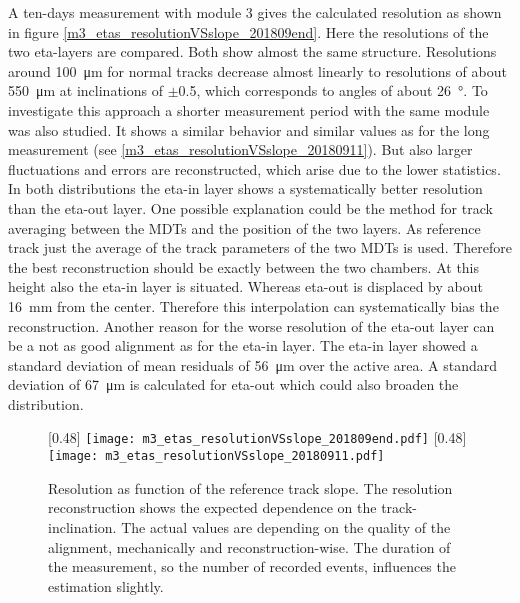 \documentclass[
twoside,            %
BCOR1.4cm,          %
10pt,               %
headings=normal,    %
headsepline,        %
clearplainpage,		%
final,              %
div=14,
open=right,
bibliography=toc
]{scrreprt}
\begin{document}
A ten-days measurement with module 3 gives the calculated resolution as shown in figure \ref{m3_etas_resolutionVSslope_201809end}.
Here the resolutions of the two eta-layers are compared.
Both show almost the same structure. 
Resolutions around \SI{100}{\micro m} for normal tracks decrease almost linearly to resolutions of about \SI{550}{\micro m} at inclinations of $\pm$0.5, which corresponds to angles of about \SI{26}{\degree}.
To investigate this approach a shorter measurement period with the same module was also studied.
It shows a similar behavior and similar values as for the long measurement (see \ref{m3_etas_resolutionVSslope_20180911}).
But also larger fluctuations and errors are reconstructed, which arise due to the lower statistics.
In both distributions the eta-in layer shows a systematically better resolution than the eta-out layer.
One possible explanation could be the method for track averaging between the MDTs and the position of the two layers.
As reference track just the average of the track parameters of the two MDTs is used.
Therefore the best reconstruction should be exactly between the two chambers.
At this height also the eta-in layer is situated.
Whereas eta-out is displaced by about \SI{16}{mm} from the center.
Therefore this interpolation can systematically bias the reconstruction.
Another reason for the worse resolution of the eta-out layer can be a not as good alignment as for the eta-in layer.
The eta-in layer showed a standard deviation of mean residuals of \SI{56}{\micro m} over the active area.
A standard deviation of \SI{67}{\micro m} is calculated for eta-out which could also broaden the distribution.

\begin{figure}[!h]
	\centering
	[0.48\textwidth]
	{\texttt{[image: m3\_etas\_resolutionVSslope\_201809end.pdf]}}
	\hfill
	[0.48\textwidth]
	{\texttt{[image: m3\_etas\_resolutionVSslope\_20180911.pdf]}}
	\vspace{-2mm}
	\caption{
		Resolution as function of the reference track slope.
		The resolution reconstruction shows the expected dependence on the track-inclination.
		The actual values are depending on the quality of the alignment, mechanically and reconstruction-wise. 
		The duration of the measurement, so the number of recorded events, influences the estimation slightly.
	}
\end{figure}
\end{document}
